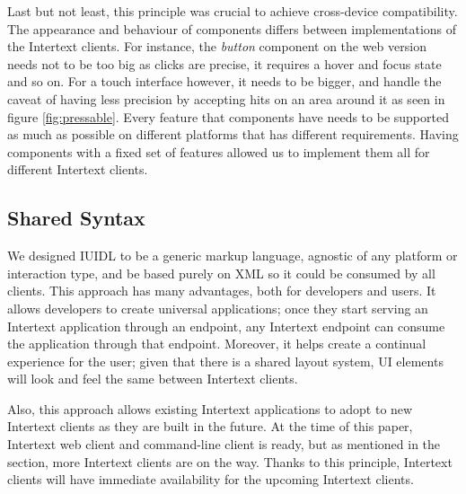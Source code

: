 Last but not least, this principle was crucial to achieve cross-device compatibility. The appearance and behaviour of components differs between implementations of the Intertext clients. For instance, the \textit{button} component on the web version needs not to be too big as clicks are precise, it requires a hover and focus state and so on. For a touch interface however, it needs to be bigger, and handle the caveat of having less precision by accepting hits on an area around it as seen in figure \ref{fig:pressable}. Every feature that components have needs to be supported as much as possible on different platforms that has different requirements. Having components with a fixed set of features allowed us to implement them all for different Intertext clients.

\subsection{Shared Syntax}

We designed IUIDL to be a generic markup language, agnostic of any platform or interaction type, and be based purely on XML so it could be consumed by all clients. This approach has many advantages, both for developers and users. It allows developers to create universal applications; once they start serving an Intertext application through an endpoint, any Intertext endpoint can consume the application through that endpoint. Moreover, it helps create a continual experience for the user; given that there is a shared layout system, UI elements will look and feel the same between Intertext clients.

Also, this approach allows existing Intertext applications to adopt to new Intertext clients as they are built in the future. At the time of this paper, Intertext web client and command-line client is ready, but as mentioned in the  section, more Intertext clients are on the way. Thanks to this principle, Intertext clients will have immediate availability for the upcoming Intertext clients.
